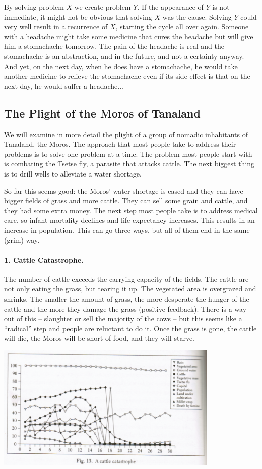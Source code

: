 By solving problem $X$ we create problem $Y$. If the appearance of $Y$ is not immediate, it might not be obvious that solving $X$ was the cause. Solving $Y$ could very well result in a recurrence of $X$, starting the cycle all over again. Someone with a headache might take some medicine that cures the headache but will give him a stomachache tomorrow. The pain of the headache is real and the stomachache is an abstraction, and in the future, and not a certainty anyway. And yet, on the next day, when he does have a stomachache, he would take another medicine to relieve the stomachache even if its side effect is that on the next day, he would suffer a headache...

\subsection*{The Plight of the Moros of Tanaland}
We will examine in more detail the plight of a group of nomadic inhabitants of Tanaland, the Moros. The approach that most people take to address their problems is to solve one problem at a time.  The problem most people start with is combating the Tsetse fly, a parasite  that attacks cattle. The next biggest thing is to drill wells to alleviate a water shortage.

So far this seems good: the Moros' water shortage is eased and they can have bigger fields of grass and more cattle. They can sell some grain and cattle, and they had some extra money. The next step most people take is to address medical care, so infant mortality declines and life expectancy increases. This results in an increase in population. This can go three ways, but all of them end in the same (grim) way.

\paragraph{1. Cattle Catastrophe.} The number of cattle exceeds the carrying capacity of the fields. The cattle are not only eating the grass, but tearing it up. The vegetated area is overgrazed and shrinks. The smaller the amount of grass, the more desperate the hunger of the cattle and the more they damage the grass (positive feedback). There is a way out of this -- slaughter or sell the majority of the cows -- but this seems like a ``radical'' step and people are reluctant to do it. Once the grass is gone, the cattle will die, the Moros will be short of food, and they will starve.

\begin{center}
	\includegraphics[width=0.8\textwidth]{images/cattlecatastrophe.png}
\end{center}

